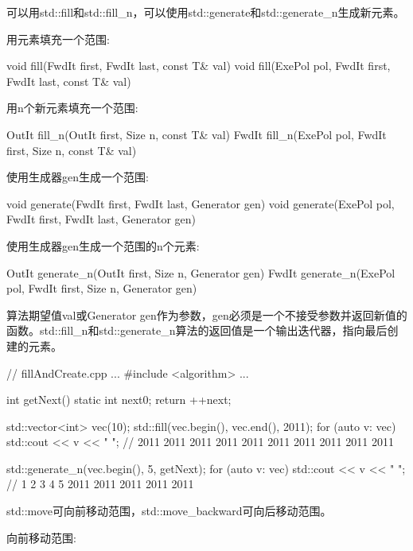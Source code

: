 
可以用std::fill和std::fill\_n，可以使用std::generate和std::generate\_n生成新元素。

用元素填充一个范围:

\begin{cpp}
void fill(FwdIt first, FwdIt last, const T& val)
void fill(ExePol pol, FwdIt first, FwdIt last, const T& val)
\end{cpp}

用n个新元素填充一个范围:

\begin{cpp}
OutIt fill_n(OutIt first, Size n, const T& val)
FwdIt fill_n(ExePol pol, FwdIt first, Size n, const T& val)
\end{cpp}

使用生成器gen生成一个范围:

\begin{cpp}
void generate(FwdIt first, FwdIt last, Generator gen)
void generate(ExePol pol, FwdIt first, FwdIt last, Generator gen)
\end{cpp}

使用生成器gen生成一个范围的n个元素:

\begin{cpp}
OutIt generate_n(OutIt first, Size n, Generator gen)
FwdIt generate_n(ExePol pol, FwdIt first, Size n, Generator gen)
\end{cpp}

算法期望值val或Generator gen作为参数，gen必须是一个不接受参数并返回新值的函数。std::fill\_n和std::generate\_n算法的返回值是一个输出迭代器，指向最后创建的元素。


\begin{cpp}
// fillAndCreate.cpp
...
#include <algorithm>
...

int getNext(){
	static int next{0};
	return ++next;
}

std::vector<int> vec(10);
std::fill(vec.begin(), vec.end(), 2011);
for (auto v: vec) std::cout << v << " ";
						// 2011 2011 2011 2011 2011 2011 2011 2011 2011 2011

std::generate_n(vec.begin(), 5, getNext);
for (auto v: vec) std::cout << v << " ";
						// 1 2 3 4 5 2011 2011 2011 2011 2011
\end{cpp}


std::move可向前移动范围，std::move\_backward可向后移动范围。

向前移动范围:

